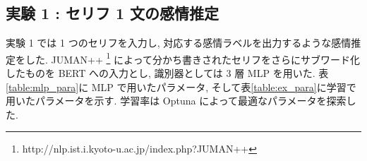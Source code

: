 \documentclass[twocolumn]{jarticle}     %
\begin{document}
\begin{table}[t]
\centering
\caption{データ数}
\label{table:data_size}
\end{table}

\subsection{\small{実験 1 : セリフ 1 文の感情推定}}
実験 1 では 1 つのセリフを入力し, 対応する感情ラベルを出力するような感情推定をした. JUMAN++ \footnote{http://nlp.ist.i.kyoto-u.ac.jp/index.php?JUMAN++} によって分かち書きされたセリフをさらにサブワード化したものを BERT への入力とし, 識別器としては 3 層 MLP を用いた. 表\ref{table:mlp_para}に MLP で用いたパラメータ, そして表\ref{table:ex_para}に学習で用いたパラメータを示す. 学習率は Optuna\cite{optuna_2019} によって最適なパラメータを探索した.
\end{document}
